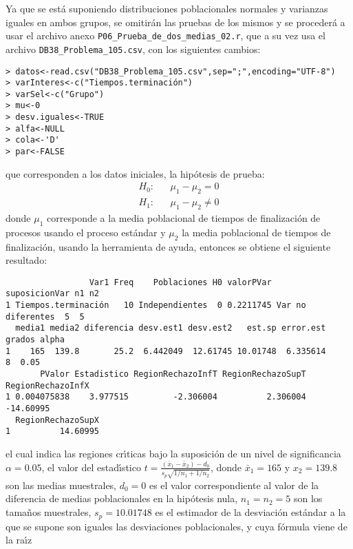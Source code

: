 \begin{solucion}
 Ya que se est\'a suponiendo distribuciones poblacionales normales
 y varianzas iguales en ambos grupos, se omitir\'an las pruebas
 de los mismos y se proceder\'a a usar el archivo anexo
 \texttt{P06\_Prueba\_de\_dos\_medias\_02.r}, que a su vez usa
 el archivo \texttt{DB38\_Problema\_105.csv}, con los siguientes cambios:
 \begin{verbatim}
> datos<-read.csv("DB38_Problema_105.csv",sep=";",encoding="UTF-8")
> varInteres<-c("Tiempos.terminación")
> varSel<-c("Grupo")
> mu<-0
> desv.iguales<-TRUE
> alfa<-NULL
> cola<-'D'
> par<-FALSE
 \end{verbatim}
 \vspace{-0.5cm}
 que corresponden a los datos iniciales, la hip\'otesis de prueba:
 \begin{eqnarray*}
  H_0: & & \mu_1 - \mu_2  =   0 \\
  H_1: & & \mu_1 - \mu_2 \neq 0
 \end{eqnarray*}
 donde $\mu_1$ corresponde a la media poblacional de tiempos
 de finalizaci\'on de procesos usando el proceso est\'andar
 y $\mu_2$ la media poblacional de tiempos de finalizaci\'on,
 usando la herramienta de ayuda,
 entonces se obtiene el siguiente resultado:
 \begin{verbatim}
                 Var1 Freq    Poblaciones H0 valorPVar     suposicionVar n1 n2
1 Tiempos.terminación   10 Independientes  0 0.2211745 Var no diferentes  5  5
  media1 media2 diferencia desv.est1 desv.est2   est.sp error.est grados alpha
1    165  139.8       25.2  6.442049  12.61745 10.01748  6.335614      8  0.05
       PValor Estadistico RegionRechazoInfT RegionRechazoSupT RegionRechazoInfX
1 0.004075838    3.977515         -2.306004          2.306004         -14.60995
  RegionRechazoSupX
1          14.60995
 \end{verbatim}
 \vspace{-0.5cm}
 el cual indica las regiones cr\'{\i}ticas bajo la suposici\'on
 de un nivel de significancia $\alpha=0.05$,
 el valor del estad\'{\i}stico $t = \frac{
 \left( \bar{x}_1 - \bar{x}_2 \right) - d_0}{s_p\sqrt{1/n_1 + 1/n_2}}$,
 donde $\bar{x}_1 = 165$ y $x_2 = 139.8$ son las medias muestrales,
 $d_0 = 0$ es el valor correspondiente al valor de la diferencia
 de medias poblacionales en la hip\'otesis nula, $n_1 = n_2 = 5$
 son los tama\~nos muestrales, $s_p = 10.01748$ es el estimador
 de la desviaci\'on est\'andar a la que se supone son iguales
 las desviaciones poblacionales, y cuya f\'ormula viene de la ra\'{\i}z

\end{solucion}
